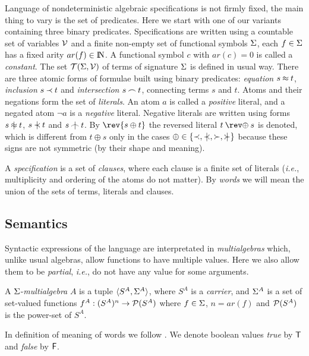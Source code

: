 Language of nondeterministic algebraic specifications is not firmly fixed,
the main thing to vary is the set of predicates.  Here we start with one of our
variants \cite{KW,KW-nong} containing three binary predicates.  Specifications are
written using a countable set of variables ${\cal V}$ and a finite non-empty set
of functional symbols $\Sigma$, each \(f\in\Sigma\) has a fixed arity \(ar(f)
\in {{\rm I\!N}}\).  A functional symbol $c$ with \(ar (c)=0\) is called a {\em
constant}.  The set ${\cal T}(\Sigma ,{\cal V})$ of terms of signature $\Sigma$ is
defined in usual way.  There are three atomic forms of formulae built using
binary predicates: {\em equation} $s\mathbin{\approx} t$, {\em inclusion} $s\mathbin{\prec} t$ and
{\em intersection} $s\mathbin{\frown} t$, connecting terms $s$ and $t$.  Atoms and their
negations form the set of {\em literals}.  An atom $a$ is called a {\em
positive} literal, and a negated atom $\neg a$ is a {\em negative} literal.
Negative literals are written using forms $s\notEq t$, $s\notIncl t$ and
$s\notInt t$.  By \(\rev{ s\oplus t}\) the reversed literal \(t\mathbin
{\rev\oplus }s\) is denoted, which is different from \(t\oplus s\) only in
the cases \(\oplus \in \{\Incl ,\notIncl ,\Cont ,\notCont\}\) because these
signs are not symmetric (by their shape and meaning).

A {\em specification} is a set of {\em clauses}, where each clause is a
finite set of literals ({\it i.e.}, multiplicity and ordering of the atoms do
not matter).  By {\em words} we will mean the union of the sets of terms,
literals and clauses.

\subsection{Semantics}

Syntactic expressions of the language are interpretated in {\em
multialgebras} \cite {Kap,Hus,MW} which, unlike usual algebras,
allow  functions to have multiple values.  Here we also allow them to be
 {\em partial}, {\it i.e.}, do not have any value for some  arguments.

\begin{definition}\label {def:nd-terms}
A $\Sigma$-{\em multialgebra} $A$ is a tuple \(\langle S^A,\Sigma^A\rangle\), where
$S^A$ is a {\em carrier}, and $\Sigma^A$ is a set of set-valued functions
\(f^A: (S^A)^n\to {\cal P}(S^A)\) where \(f\in \Sigma\), \(n=ar(f)\) and
\({\cal P}(S^A)\) is the power-set of \(S^A\).
\end{definition}

In definition of meaning of words we follow \cite {MW,MW-II}. We denote
boolean values {\em true} by \({\sf T}\) and {\em false} by \({\sf F}\).

